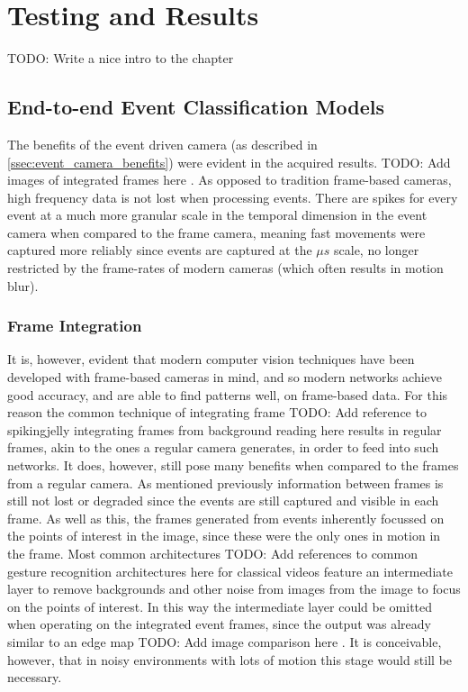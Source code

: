 \chapter{Testing and Results} \label{chap:testing_and_results}

\color{red} TODO: Write a nice intro to the chapter \color{black}

\section{End-to-end Event Classification Models}

The benefits of the event driven camera (as described in \cref{ssec:event_camera_benefits}) were evident in the acquired results. \color{red} TODO: Add images of integrated frames here \color{black}. As opposed to tradition frame-based cameras, high frequency data is not lost when processing events. There are spikes for every event at a much more granular scale in the temporal dimension in the event camera when compared to the frame camera, meaning fast movements were captured more reliably since events are captured at the $\mu s$ scale, no longer restricted by the frame-rates of modern cameras (which often results in motion blur).

\subsection{Frame Integration}

It is, however, evident that modern computer vision techniques have been developed with frame-based cameras in mind, and so modern networks achieve good accuracy, and are able to find patterns well, on frame-based data. For this reason the common technique of integrating frame \color{red} TODO: Add reference to spikingjelly integrating frames from background reading here \color{black} results in regular frames, akin to the ones a regular camera generates, in order to feed into such networks. It does, however, still pose many benefits when compared to the frames from a regular camera. As mentioned previously information between frames is still not lost or degraded since the events are still captured and visible in each frame. As well as this, the frames generated from events inherently focussed on the points of interest in the image, since these were the only ones in motion in the frame. Most common architectures \color{red} TODO: Add references to common gesture recognition architectures here \color{black} for classical videos feature an intermediate layer to remove backgrounds and other noise from images from the image to focus on the points of interest. In this way the intermediate layer could be omitted when operating on the integrated event frames, since the output was already similar to an edge map \color{red} TODO: Add image comparison here \color{black}. It is conceivable, however, that in noisy environments with lots of motion this stage would still be necessary.

